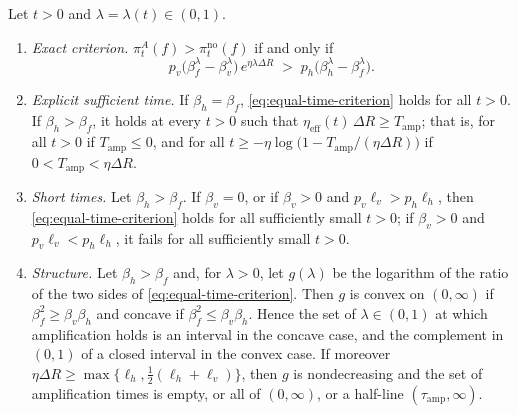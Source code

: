 \begin{proposition}
\label{prop:equal-time}
Let $t>0$ and $\lambda=\lambda(t)\in(0,1)$.
\begin{enumerate}
\item[\textup{(i)}] \emph{Exact criterion.}
$\pi^{A}_t(f)>\pi^{\mathrm{no}}_t(f)$ if and only if
\begin{equation}\label{eq:equal-time-criterion}
p_v\bigl(\beta_f^{\lambda}-\beta_v^{\lambda}\bigr)\,e^{\eta\lambda\Delta R}
\;>\;p_h\bigl(\beta_h^{\lambda}-\beta_f^{\lambda}\bigr).
\end{equation}
\item[\textup{(ii)}] \emph{Explicit sufficient time.} If $\beta_h=\beta_f$,
\eqref{eq:equal-time-criterion} holds for all $t>0$. If $\beta_h>\beta_f$,
it holds at every $t>0$ such that
$\eta_{\mathrm{eff}}(t)\,\Delta R\ge T_{\mathrm{amp}}$; that is, for all
$t>0$ if $T_{\mathrm{amp}}\le0$, and for all
$t\ge-\eta\log\bigl(1-T_{\mathrm{amp}}/(\eta\Delta R)\bigr)$ if
$0<T_{\mathrm{amp}}<\eta\Delta R$.
\item[\textup{(iii)}] \emph{Short times.} Let $\beta_h>\beta_f$. If
$\beta_v=0$, or if $\beta_v>0$ and $p_v\ell_v>p_h\ell_h$, then
\eqref{eq:equal-time-criterion} holds for all sufficiently small $t>0$; if
$\beta_v>0$ and $p_v\ell_v<p_h\ell_h$, it fails for all sufficiently small
$t>0$.
\item[\textup{(iv)}] \emph{Structure.} Let $\beta_h>\beta_f$ and, for
$\lambda>0$, let $g(\lambda)$ be the logarithm of the ratio of the two sides
of \eqref{eq:equal-time-criterion}. Then $g$ is convex on $(0,\infty)$ if
$\beta_f^2\ge\beta_v\beta_h$ and concave if
$\beta_f^2\le\beta_v\beta_h$. Hence the set of $\lambda\in(0,1)$ at which
amplification holds is an interval in the concave case, and the complement
in $(0,1)$ of a closed interval in the convex case. If moreover
$\eta\Delta R\ge\max\{\ell_h,\tfrac12(\ell_h+\ell_v)\}$, then $g$ is
nondecreasing and the set of amplification times is empty, or all of
$(0,\infty)$, or a half-line $(\tau_{\mathrm{amp}},\infty)$.
\end{enumerate}
\end{proposition}

